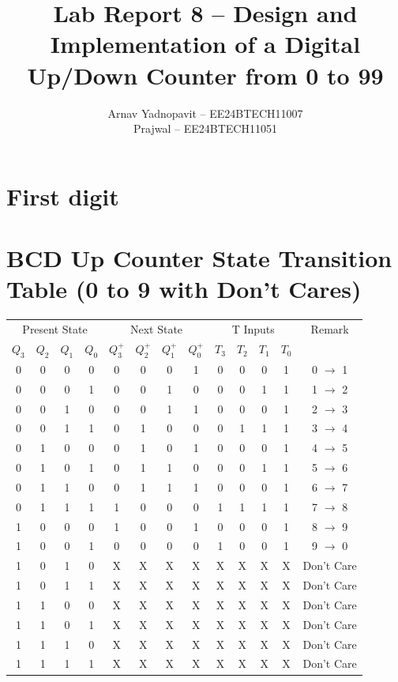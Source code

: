 \documentclass{article}
\title{\textbf{Lab Report 8 – Design and Implementation of a Digital Up/Down Counter from 0 to 99}}
\author{
    Arnav Yadnopavit -- EE24BTECH11007\\
    Prajwal -- EE24BTECH11051
    }
\date{}
\begin{document}
    
    \maketitle
    \section{First digit}
    \section*{BCD Up Counter State Transition Table (0 to 9 with Don't Cares)}
    
    \begin{center}
    \begin{tabular}{cccc|cccc|cccc|c}
    \toprule
    \multicolumn{4}{c|}{Present State} & \multicolumn{4}{c|}{Next State} & \multicolumn{4}{c|}{T Inputs} & Remark \\
    $Q_3$ & $Q_2$ & $Q_1$ & $Q_0$ & $Q_3^+$ & $Q_2^+$ & $Q_1^+$ & $Q_0^+$ & $T_3$ & $T_2$ & $T_1$ & $T_0$ & \\
    \midrule
    0 & 0 & 0 & 0 & 0 & 0 & 0 & 1 & 0 & 0 & 0 & 1 & 0 $\rightarrow$ 1 \\
    0 & 0 & 0 & 1 & 0 & 0 & 1 & 0 & 0 & 0 & 1 & 1 & 1 $\rightarrow$ 2 \\
    0 & 0 & 1 & 0 & 0 & 0 & 1 & 1 & 0 & 0 & 0 & 1 & 2 $\rightarrow$ 3 \\
    0 & 0 & 1 & 1 & 0 & 1 & 0 & 0 & 0 & 1 & 1 & 1 & 3 $\rightarrow$ 4 \\
    0 & 1 & 0 & 0 & 0 & 1 & 0 & 1 & 0 & 0 & 0 & 1 & 4 $\rightarrow$ 5 \\
    0 & 1 & 0 & 1 & 0 & 1 & 1 & 0 & 0 & 0 & 1 & 1 & 5 $\rightarrow$ 6 \\
    0 & 1 & 1 & 0 & 0 & 1 & 1 & 1 & 0 & 0 & 0 & 1 & 6 $\rightarrow$ 7 \\
    0 & 1 & 1 & 1 & 1 & 0 & 0 & 0 & 1 & 1 & 1 & 1 & 7 $\rightarrow$ 8 \\
    1 & 0 & 0 & 0 & 1 & 0 & 0 & 1 & 0 & 0 & 0 & 1 & 8 $\rightarrow$ 9 \\
    1 & 0 & 0 & 1 & 0 & 0 & 0 & 0 & 1 & 0 & 0 & 1 & 9 $\rightarrow$ 0 \\
    \midrule
    1 & 0 & 1 & 0 & X & X & X & X & X & X & X & X & Don't Care \\
    1 & 0 & 1 & 1 & X & X & X & X & X & X & X & X & Don't Care \\
    1 & 1 & 0 & 0 & X & X & X & X & X & X & X & X & Don't Care \\
    1 & 1 & 0 & 1 & X & X & X & X & X & X & X & X & Don't Care \\
    1 & 1 & 1 & 0 & X & X & X & X & X & X & X & X & Don't Care \\
    1 & 1 & 1 & 1 & X & X & X & X & X & X & X & X & Don't Care \\
    \bottomrule
    \end{tabular}
    \end{center}
\end{document}
